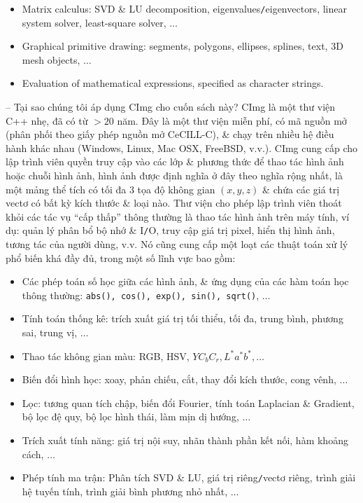 \documentclass{article}
\begin{document}
\begin{itemize}
\begin{itemize}
\begin{itemize}
            \item Matrix calculus: SVD \& LU decomposition, eigenvalues{\tt/}eigenvectors, linear system solver, least-square solver, $\ldots$
            \item Graphical primitive drawing: segments, polygons, ellipses, splines, text, 3D mesh objects, $\ldots$
            \item Evaluation of mathematical expressions, specified as character strings.
        \end{itemize}
        -- {\sf Tại sao chúng tôi áp dụng CImg cho cuốn sách này?} CImg là một thư viện C++ nhẹ, đã có từ $> 20$ năm. Đây là một thư viện miễn phí, có mã nguồn mở (phân phối theo giấy phép nguồn mở CeCILL-C), \& chạy trên nhiều hệ điều hành khác nhau (Windows, Linux, Mac OSX, FreeBSD, v.v.). CImg cung cấp cho lập trình viên quyền truy cập vào các lớp \& phương thức để thao tác hình ảnh hoặc chuỗi hình ảnh, hình ảnh được định nghĩa ở đây theo nghĩa rộng nhất, là một mảng thể tích có tối đa 3 tọa độ không gian $(x,y,z)$ \& chứa các giá trị vectơ có bất kỳ kích thước \& loại nào. Thư viện cho phép lập trình viên thoát khỏi các tác vụ ``cấp thấp'' thông thường là thao tác hình ảnh trên máy tính, ví dụ: quản lý phân bổ bộ nhớ \& I{\tt/}O, truy cập giá trị pixel, hiển thị hình ảnh, tương tác của người dùng, v.v. Nó cũng cung cấp một loạt các thuật toán xử lý phổ biến khá đầy đủ, trong một số lĩnh vực bao gồm:
        \begin{itemize}
            \item Các phép toán số học giữa các hình ảnh, \& ứng dụng của các hàm toán học thông thường: {\tt abs(), cos(), exp(), sin(), sqrt()}, $\ldots$
            \item Tính toán thống kê: trích xuất giá trị tối thiểu, tối đa, trung bình, phương sai, trung vị, $\ldots$
            \item Thao tác không gian màu: RGB, HSV, $YC_bC_r,L^*a^*b^*,\ldots$
            \item Biến đổi hình học: xoay, phản chiếu, cắt, thay đổi kích thước, cong vênh, $\ldots$
            \item Lọc: tương quan tích chập, biến đổi Fourier, tính toán Laplacian \& Gradient, bộ lọc đệ quy, bộ lọc hình thái, làm mịn dị hướng, $\ldots$
            \item Trích xuất tính năng: giá trị nội suy, nhãn thành phần kết nối, hàm khoảng cách, $\ldots$
            \item Phép tính ma trận: Phân tích SVD \& LU, giá trị riêng{\tt/}vectơ riêng, trình giải hệ tuyến tính, trình giải bình phương nhỏ nhất, $\ldots$

\end{itemize}
\end{itemize}
\end{itemize}
\end{document}
